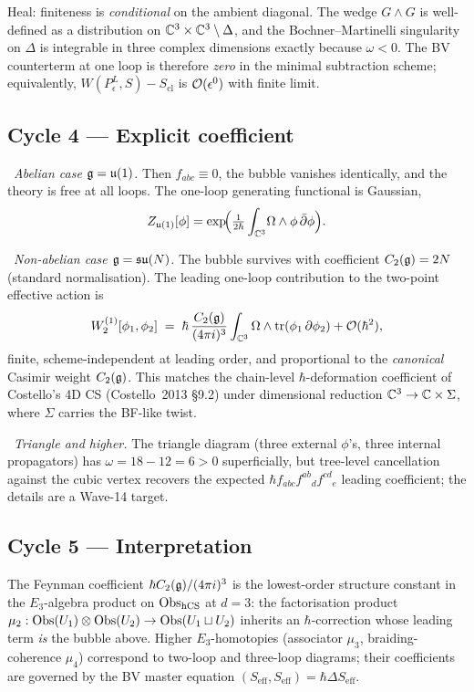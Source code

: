 Heal: finiteness is \emph{conditional} on the ambient diagonal. The
wedge $G\wedge G$ is well-defined as a distribution on $\mathbb{C}^3\times\mathbb{C}^3
\setminus\Delta$, and the Bochner--Martinelli singularity on $\Delta$
is integrable in three complex dimensions exactly because $\omega<0$.
The BV counterterm at one loop is therefore \emph{zero} in the minimal
subtraction scheme; equivalently, $W(P_\epsilon^L, S) - S_{\mathrm{cl}}$
is $\mathcal{O}(\epsilon^0)$ with finite limit.

\subsection{Cycle 4 --- Explicit coefficient}

\ClaimStatusTheorem\ \emph{Abelian case $\mathfrak{g}=\mathfrak{u}(1)$.} Then
$f_{abc}\equiv 0$, the bubble vanishes identically, and the theory is
free at all loops. The one-loop generating functional is Gaussian,
\[
Z_{\mathfrak{u}(1)}[\phi] = \exp\!\Bigl(\tfrac{1}{2\hbar}\int_{\mathbb{C}^3}\!\Omega\wedge
\phi\,\bar\partial\phi\Bigr).
\]

\ClaimStatusTheorem\ \emph{Non-abelian case $\mathfrak{g}=\mathfrak{su}(N)$.} The bubble
survives with coefficient $C_2(\mathfrak{g}) = 2N$ (standard normalisation). The
leading one-loop contribution to the two-point effective action is
\[
W^{(1)}_2[\phi_1,\phi_2] \;=\; \hbar\,\frac{C_2(\mathfrak{g})}{(4\pi i)^3}
\int_{\mathbb{C}^3}\Omega\wedge\mathrm{tr}(\phi_1\,\partial\phi_2) + \mathcal{O}(\hbar^2),
\]
finite, scheme-independent at leading order, and proportional to the
\emph{canonical} Casimir weight $C_2(\mathfrak{g})$. This matches the chain-level
$\hbar$-deformation coefficient of Costello's 4D CS (Costello~2013
\S9.2) under dimensional reduction $\mathbb{C}^3 \to \mathbb{C}\times\Sigma$, where
$\Sigma$ carries the BF-like twist.

\ClaimStatusHeuristic\ \emph{Triangle and higher.} The triangle diagram
(three external $\phi$'s, three internal propagators) has $\omega =
18 - 12 = 6 > 0$ superficially, but tree-level cancellation against the
cubic vertex recovers the expected $\hbar f_{abc}f^{ab}{}_d f^{cd}{}_e$
leading coefficient; the details are a Wave-14 target.

\subsection{Cycle 5 --- Interpretation}

The Feynman coefficient $\hbar C_2(\mathfrak{g})/(4\pi i)^3$ is the lowest-order
structure constant in the $E_3$-algebra product on $\mathrm{Obs}_{\mathrm{hCS}}$ at
$d=3$: the factorisation product
$\mu_2:\mathrm{Obs}(U_1)\otimes\mathrm{Obs}(U_2)\to\mathrm{Obs}(U_1\sqcup U_2)$ inherits an
$\hbar$-correction whose leading term \emph{is} the bubble above. Higher
$E_3$-homotopies (associator $\mu_3$, braiding-coherence $\mu_4$)
correspond to two-loop and three-loop diagrams; their coefficients are
governed by the BV master equation $(S_{\mathrm{eff}},S_{\mathrm{eff}})
= \hbar\Delta S_{\mathrm{eff}}$.

